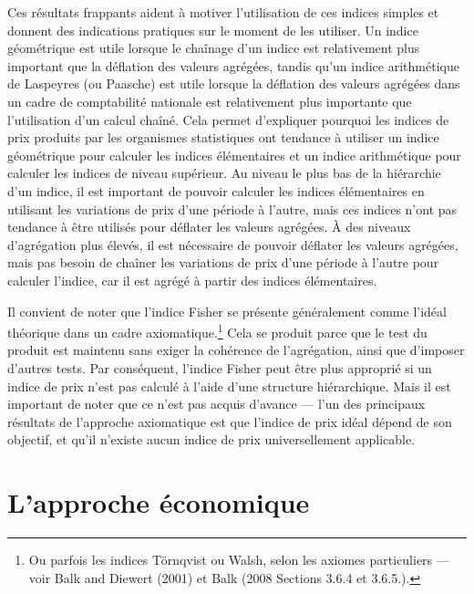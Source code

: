 \documentclass[]{article}
\begin{document}
Ces résultats frappants aident à motiver l'utilisation de ces indices simples et donnent des indications pratiques sur le moment de les utiliser. Un indice géométrique est utile lorsque le chaînage d'un indice est relativement plus important que la déflation des valeurs agrégées, tandis qu'un indice arithmétique de Laspeyres (ou Paasche) est utile lorsque la déflation des valeurs agrégées dans un cadre de comptabilité nationale est relativement plus importante que l'utilisation d'un calcul chaîné. Cela permet d'expliquer pourquoi les indices de prix produits par les organismes statistiques ont tendance à utiliser un indice géométrique pour calculer les indices élémentaires et un indice arithmétique pour calculer les indices de niveau supérieur. Au niveau le plus bas de la hiérarchie d'un indice, il est important de pouvoir calculer les indices élémentaires en utilisant les variations de prix d'une période à l'autre, mais ces indices n'ont pas tendance à être utilisés pour déflater les valeurs agrégées. À des niveaux d'agrégation plus élevés, il est nécessaire de pouvoir déflater les valeurs agrégées, mais pas besoin de chaîner les variations de prix d'une période à l'autre pour calculer l'indice, car il est agrégé à partir des indices élémentaires.

Il convient de noter que l'indice Fisher se présente généralement comme l'idéal théorique dans un cadre axiomatique.\footnote{Ou parfois les indices Törnqvist ou Walsh, selon les axiomes particuliers --- voir Balk and Diewert (2001) et Balk (2008 Sections 3.6.4 et 3.6.5.).} Cela se produit parce que le test du produit est maintenu sans exiger la cohérence de l'agrégation, ainsi que d'imposer d'autres tests. Par conséquent, l'indice Fisher peut être plus approprié si un indice de prix n'est pas calculé à l'aide d'une structure hiérarchique. Mais il est important de noter que ce n'est pas acquis d'avance --- l'un des principaux résultats de l'approche axiomatique est que l'indice de prix idéal dépend de son objectif, et qu'il n'existe aucun indice de prix universellement applicable.

\hypertarget{lapproche-uxe9conomique}{%
\section{L'approche économique}\label{lapproche-uxe9conomique}}
\end{document}
